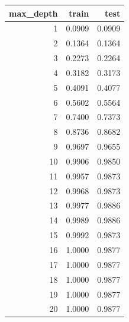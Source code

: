 \begin{tabular}{rrr}
\toprule
max_depth & train & test \\
\midrule
1 & 0.0909 & 0.0909 \\
2 & 0.1364 & 0.1364 \\
3 & 0.2273 & 0.2264 \\
4 & 0.3182 & 0.3173 \\
5 & 0.4091 & 0.4077 \\
6 & 0.5602 & 0.5564 \\
7 & 0.7400 & 0.7373 \\
8 & 0.8736 & 0.8682 \\
9 & 0.9697 & 0.9655 \\
10 & 0.9906 & 0.9850 \\
11 & 0.9957 & 0.9873 \\
12 & 0.9968 & 0.9873 \\
13 & 0.9977 & 0.9886 \\
14 & 0.9989 & 0.9886 \\
15 & 0.9992 & 0.9873 \\
16 & 1.0000 & 0.9877 \\
17 & 1.0000 & 0.9877 \\
18 & 1.0000 & 0.9877 \\
19 & 1.0000 & 0.9877 \\
20 & 1.0000 & 0.9877 \\
\bottomrule
\end{tabular}
